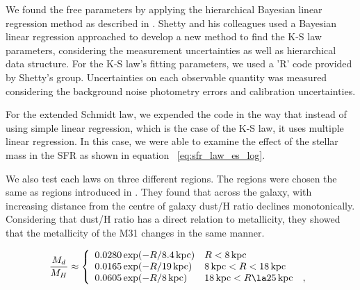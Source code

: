\documentclass[useAMS,usenatbib]{mn2e}
\newcommand \kpc        {\,{\rm kpc}}
\begin{document}
We found the free parameters by applying the hierarchical Bayesian linear regression method as described in \cite{Shetty13}. Shetty and his colleagues used a Bayesian linear regression approached to develop a new method to find the K-S law parameters, considering the measurement uncertainties as well as hierarchical data structure. For the K-S law's fitting parameters, we used a 'R' code provided by Shetty's group. Uncertainties on each observable quantity was measured considering the background noise photometry errors and calibration uncertainties.%
 
For the extended Schmidt law, we expended the code in the way that instead of using simple linear regression, which is the case of the K-S law, it uses multiple linear regression. In this case, we were able to examine the effect of the stellar mass in the SFR as shown in equation ~\ref{eq:sfr_law_es_log}.

We also test each laws on three different regions. The regions were chosen the same as regions introduced in \cite{Draine14}. They found that across the galaxy, with increasing distance from the centre of galaxy dust/H ratio declines monotonically. Considering that dust/H ratio has a direct relation to metallicity, they showed that the metallicity of the M31 changes in the same manner.

\begin{equation}
\label{eq:dust2gas_vs_R}
\frac{M_d}{M_H} \approx
\left\{ \begin{array}{l l}
0.0280 \exp(-R/8.4\kpc)  & R< 8\kpc\\
0.0165 \exp(-R/19\kpc)   & 8\kpc < R < 18\kpc\\
0.0605 \exp(-R/8\kpc)    & 18\kpc < R \la 25\kpc ~~~,\\
\end{array}
\right.
\end{equation}
\end{document}
